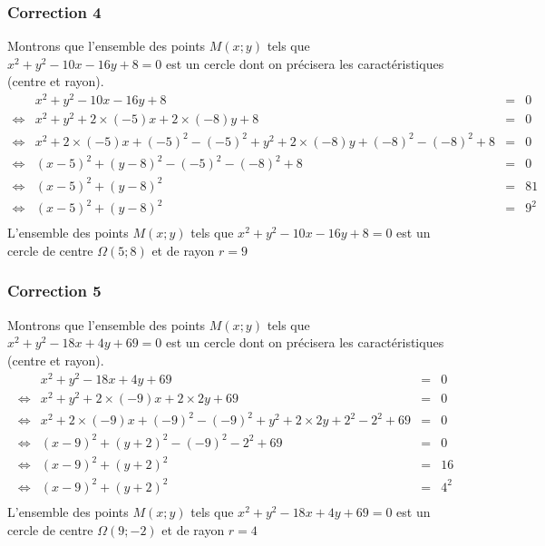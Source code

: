 \documentclass[15pt, mathserif]{beamer}
\begin{document}
\begin{frame}
\vspace{-10mm}
	\frametitle{Correction 4}
Montrons que l'ensemble des points $M(x; y)$ tels que $x^2+y^2-10x-16y+8=0$ est un cercle dont on précisera les caractéristiques (centre et rayon). 
 $$\begin{array}{crcl} 
 & x^2+y^2-10x-16y+8& = & 0 \\ 
 \Leftrightarrow & x^2+y^2+2 \times\left(-5\right)x+2 \times \left(-8\right)y+8 & = & 0 \\ 
 \Leftrightarrow & x^2+2 \times\left(-5\right)x+ \left(-5\right)^2-\left(-5\right)^2+y^2+2 \times \left(-8\right)y + \left(-8\right)^2-\left(-8\right)^2+8 & = & 0 \\ 
 \Leftrightarrow & (x-5)^2+(y-8)^2-\left(-5\right)^2-\left(-8\right)^2+8 & = & 0 \\ 
 \Leftrightarrow & (x-5)^2+(y-8)^2 & = & 81 \\ 
 \Leftrightarrow & (x-5)^2+(y-8)^2 & = & 9^2 \\ 
 \end{array}$$ 
 L'ensemble des points $M(x; y)$ tels que $x^2+y^2-10x-16y+8=0$ est un cercle de centre $\Omega(5;8)$ et de rayon $r =9$\end{frame}


\begin{frame}
\vspace{-10mm}
	\frametitle{Correction 5}
Montrons que l'ensemble des points $M(x; y)$ tels que $x^2+y^2-18x+4y+69=0$ est un cercle dont on précisera les caractéristiques (centre et rayon). 
 $$\begin{array}{crcl} 
 & x^2+y^2-18x+4y+69& = & 0 \\ 
 \Leftrightarrow & x^2+y^2+2 \times\left(-9\right)x+2 \times 2y+69 & = & 0 \\ 
 \Leftrightarrow & x^2+2 \times\left(-9\right)x+ \left(-9\right)^2-\left(-9\right)^2+y^2+2 \times 2y + 2^2-2^2+69 & = & 0 \\ 
 \Leftrightarrow & (x-9)^2+(y+2)^2-\left(-9\right)^2-2^2+69 & = & 0 \\ 
 \Leftrightarrow & (x-9)^2+(y+2)^2 & = & 16 \\ 
 \Leftrightarrow & (x-9)^2+(y+2)^2 & = & 4^2 \\ 
 \end{array}$$ 
 L'ensemble des points $M(x; y)$ tels que $x^2+y^2-18x+4y+69=0$ est un cercle de centre $\Omega(9;-2)$ et de rayon $r =4$\end{frame}
\end{document}
